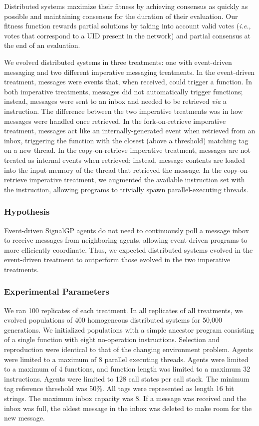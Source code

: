 Distributed systems maximize their fitness by achieving consensus as quickly as possible and maintaining consensus for the duration of their evaluation. 
Our fitness function rewards partial solutions by taking into account valid votes (\textit{i.e.}, votes that correspond to a UID present in the network) and partial consensus at the end of an evaluation. 

We evolved distributed systems in three treatments: one with event-driven messaging and two different imperative messaging treatments. 
In the event-driven treatment, messages were events that, when received, could trigger a function. 
In both imperative treatments, messages did not automatically trigger functions; instead, messages were sent to an inbox and needed to be retrieved \textit{via} a  instruction. 
The difference between the two imperative treatments was in how messages were handled once retrieved. 
In the fork-on-retrieve imperative treatment, messages act like an internally-generated event when retrieved from an inbox, triggering the function with the closest (above a threshold) matching tag on a new thread. 
In the copy-on-retrieve imperative treatment, messages are not treated as internal events when retrieved; instead, message contents are loaded into the input memory of the thread that retrieved the message. 
In the copy-on-retrieve imperative treatment, we augmented the available instruction set with the  instruction, allowing programs to trivially spawn parallel-executing threads. 

\subsubsection{Hypothesis}

Event-driven SignalGP agents do not need to continuously poll a message inbox to receive messages from neighboring agents, allowing event-driven programs to more efficiently coordinate. 
Thus, we expected distributed systems evolved in the event-driven treatment to outperform those evolved in the two imperative treatments. 

\subsubsection{Experimental Parameters}
We ran 100 replicates of each treatment. 
In all replicates of all treatments, we evolved populations of 400 homogeneous distributed systems for 50,000 generations. 
We initialized populations with a simple ancestor program consisting of a single function with eight no-operation instructions. 
Selection and reproduction were identical to that of the changing environment problem. 
Agents were limited to a maximum of 8 parallel executing threads. 
Agents were limited to a maximum of 4 functions, and function length was limited to a maximum 32 instructions. 
Agents were limited to 128 call states per call stack. 
The minimum tag reference threshold was 50\%. All tags were represented as length 16 bit strings. 
The maximum inbox capacity was 8. 
If a message was received and the inbox was full, the oldest message in the inbox was deleted to make room for the new message. 

